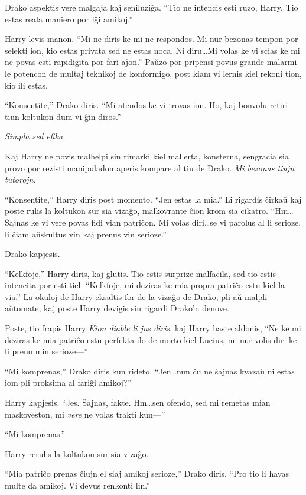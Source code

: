 Drako aspektis vere malgaja kaj seniluziĝa. ``Tio ne intencis esti
ruzo, Harry. Tio estas reala maniero por iĝi amikoj.''

Harry levis manon. ``Mi ne diris ke mi ne respondos. Mi nur bezonas
tempon por selekti ion, kio estas privata sed ne estas noca. Ni
diru\ldots Mi volas ke vi scias ke mi ne povas esti rapidigita por
fari aĵon.'' Paŭzo por pripensi povus grande malarmi le potencon de
multaj teknikoj de konformigo, post kiam vi lernis kiel rekoni tion,
kio ili estas.

``Konsentite,'' Drako diris. ``Mi atendos ke vi trovas ion. Ho, kaj
bonvolu retiri tiun koltukon dum vi ĝin diros.''

\emph{Simpla sed efika.}

Kaj Harry ne povis malhelpi sin rimarki kiel mallerta, konsterna,
sengracia sia provo por rezisti manipuladon aperis kompare al tiu de
Drako. \emph{Mi bezonas tiujn tutorojn.}

``Konsentite,'' Harry diris post momento. ``Jen estas la mia.'' Li
rigardis ĉirkaŭ kaj poste rulis la koltukon sur sia vizaĝo,
malkovrante ĉion krom sia cikatro. ``Hm\ldots Ŝajnas ke vi vere povas
fidi vian patriĉon. Mi volas diri\ldots se vi parolus al li serioze,
li ĉiam aŭskultus vin kaj prenus vin serioze.''

Drako kapjesis.

``Kelkfoje,'' Harry diris, kaj glutis. Tio estis surprize malfacila,
sed tio estis intencita por esti tiel. ``Kelkfoje, mi deziras ke mia
propra patriĉo estu kiel la via.'' La okuloj de Harry eksaltis for de
la vizaĝo de Drako, pli aŭ malpli aŭtomate, kaj poste Harry devigis
sin rigardi Drako'n denove.

Poste, tio frapis Harry \emph{Kion diable li ĵus diris}, kaj Harry
haste aldonis, ``Ne ke mi deziras ke mia patriĉo estu perfekta ilo
de morto kiel Lucius, mi nur volis diri ke li prenu min serioze—''

``Mi komprenas,'' Drako diris kun rideto. ``Jen\ldots nun ĉu ne ŝajnas
kvazaŭ ni estas iom pli proksima al fariĝi amikoj?''

Harry kapjesis. ``Jes. Ŝajnas, fakte. Hm\ldots sen ofendo, sed mi
remetas mian maskoveston, mi \emph{vere} ne volas trakti kun—''

``Mi komprenas.''

Harry rerulis la koltukon sur sia vizaĝo.

``Mia patriĉo prenas ĉiujn el siaj amikoj serioze,'' Drako
diris. ``Pro tio li havas multe da amikoj. Vi devus renkonti lin.''

